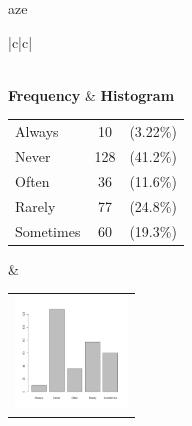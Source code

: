  aze 
  \begin{center}
    \addtolength{\leftskip}{-4cm}\addtolength{\rightskip}{-4cm}
    \begin{tabular}{|c|c|}

      \hline
        \\
      \hline
        {\bf Frequency} & {\bf Histogram}  \\
          \begin{tabular}{@{}l@{ : }cl@{}}
            Always & 10 &(3.22\%) \\
            Never & 128 &(41.2\%) \\
            Often & 36 &(11.6\%) \\
            Rarely & 77 &(24.8\%) \\
            Sometimes & 60 &(19.3\%) \\
          \end{tabular}
      &
          \begin{tabular}{@{}l@{}}
            \includegraphics[width=3cm]{graphUniv/V11-barplot}
          \end{tabular}
      \\ \hline 

    \end{tabular}
  \end{center}
  
  



